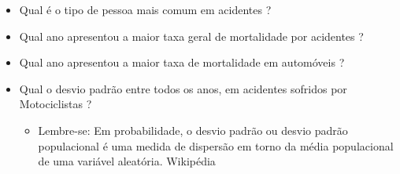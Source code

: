 \documentclass[12pt]{article}
\begin{document}
\begin{itemize}
    \item Qual é o tipo de pessoa mais comum em acidentes ?
    \item Qual ano apresentou a maior taxa geral de mortalidade por acidentes ?
    \item Qual ano apresentou a maior taxa de mortalidade em automóveis ?
    \item Qual o desvio padrão entre todos os anos, em acidentes sofridos por Motociclistas ?
    	\begin{itemize}
    		\item Lembre-se: Em probabilidade, o desvio padrão ou desvio padrão populacional é uma medida de dispersão em torno da média populacional de uma variável aleatória. Wikipédia
    	\end{itemize}
\end{itemize}




% 
% 
\end{document}
